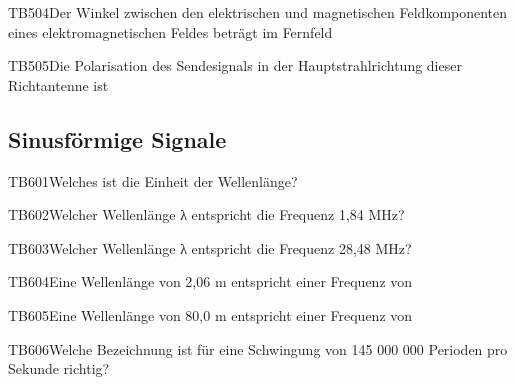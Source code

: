 \begin{question}{TB504}{Der Winkel zwischen den elektrischen und magnetischen Feldkomponenten eines elektromagnetischen Feldes beträgt im Fernfeld}
\end{question}

\begin{question}{TB505}{Die Polarisation des Sendesignals in der Hauptstrahlrichtung dieser Richtantenne ist}
\end{question}

\subsection{Sinusförmige Signale}

\begin{question}{TB601}{Welches ist die Einheit der Wellenlänge?}
\end{question}

\begin{question}{TB602}{Welcher Wellenlänge λ entspricht die Frequenz 1,84 MHz?}
\end{question}

\begin{question}{TB603}{Welcher Wellenlänge λ entspricht die Frequenz 28,48 MHz?}
\end{question}

\begin{question}{TB604}{Eine Wellenlänge von 2,06 m entspricht einer Frequenz von}
\end{question}

\begin{question}{TB605}{Eine Wellenlänge von 80,0 m entspricht einer Frequenz von}
\end{question}

\begin{question}{TB606}{Welche Bezeichnung ist für eine Schwingung von 145 000 000 Perioden pro Sekunde richtig?}
\end{question}

